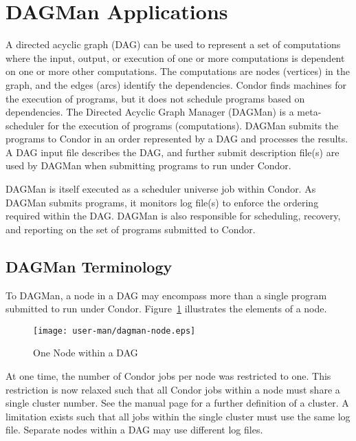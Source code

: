 \section{\label{sec:DAGMan}DAGMan Applications}

A directed acyclic graph (DAG) can be used to represent a set of computations
where the input, output, or execution of one or more computations
is dependent on one or more other computations.
The computations are nodes (vertices) in the graph,
and the edges (arcs) identify the dependencies.
Condor finds machines for the execution of programs, but it
does not schedule programs based on dependencies.
The Directed Acyclic Graph Manager (DAGMan) is a meta-scheduler for 
the execution of programs (computations). 
DAGMan submits the programs to Condor in an order represented by
a DAG and processes the results.
A DAG input file describes the DAG, and
further submit description file(s) are used by DAGMan
when submitting programs to run under Condor.

DAGMan is itself executed as a scheduler universe job
within Condor.
As DAGMan submits programs, it monitors log file(s) 
to enforce the ordering required within the DAG.
DAGMan is also responsible for scheduling, recovery, and reporting
on the set of programs submitted to Condor.

\subsection{\label{sec:DAGTerminology}DAGMan Terminology}

To DAGMan, a node in a DAG may encompass more than a single
program submitted to run under Condor.
Figure~\ref{fig:dagman-node} illustrates the elements of a node.

\begin{figure}[hbt]
\centering
\texttt{[image: user-man/dagman-node.eps]}
\caption{\label{fig:dagman-node}One Node within a DAG}
\end{figure}

At one time,
the number of Condor jobs per node was restricted to one.
This restriction is now relaxed such that all Condor jobs
within a node must share a single cluster number.
See the
 manual page
for a further definition of a cluster.
A limitation exists such that
all jobs within the single cluster must use the same log file.
Separate nodes within a DAG may use different log files.

